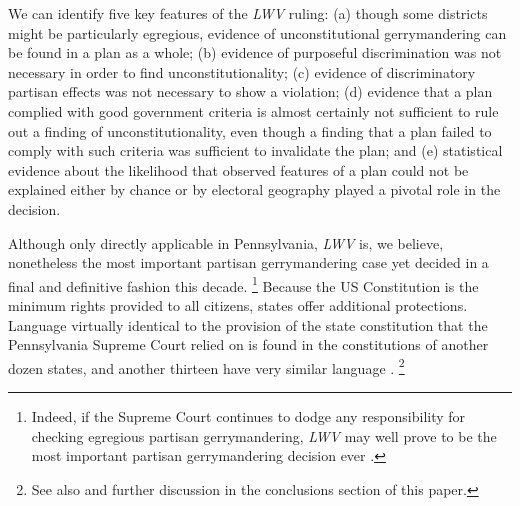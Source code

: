 \par
    We can identify five key features of the \textit{LWV} ruling: (a) though some districts might be particularly egregious, evidence of unconstitutional gerrymandering can be found in a plan as a whole; (b) evidence of purposeful discrimination was not necessary in order to find unconstitutionality; (c) evidence of discriminatory partisan effects was not necessary to show a violation; (d) evidence that a plan complied with good government criteria is almost certainly not sufficient to rule out a finding of unconstitutionality, even though a finding that a plan failed to comply with such criteria was sufficient to invalidate the plan; and (e) statistical evidence about the likelihood that  observed features of a plan could not be explained either by chance or by electoral geography played a pivotal role in the decision. 
\par
    Although only directly applicable in Pennsylvania, \textit{LWV} is, we believe, nonetheless the most important partisan gerrymandering case yet decided in a final and definitive fashion this decade. 
        \footnote{Indeed, if the Supreme Court continues to dodge any responsibility for checking egregious partisan gerrymandering, \textit{LWV} may well prove to be the most important partisan gerrymandering decision ever \citep{Grofman_Cervas_2018_ELJ}.}
    Because the US Constitution is the minimum rights provided to all citizens, states offer additional protections. Language virtually identical to the provision of the state constitution that the Pennsylvania Supreme Court relied on is found in the constitutions of another dozen states, and another thirteen have very similar language \citep{Douglas2014_RightToVote}.
        \footnote{See also \citet{Elmendorf2018} and further discussion in the conclusions section of this paper.}
